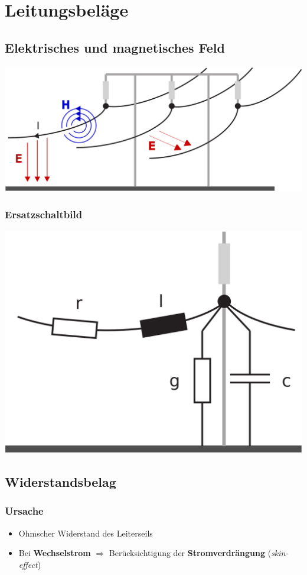 \section{Leitungsbeläge}

\subsection{Elektrisches und magnetisches Feld}
\includegraphics[width=0.98\columnwidth, align=c]{images/Elektrisches_und_Magnetisches_Feld.png}

\subsubsection{Ersatzschaltbild}

\includegraphics[width=0.55\columnwidth, align=c]{images/Ersatzschaltbild.png}


\subsection{Widerstandsbelag}

\subsubsection{Ursache}
\begin{itemize}
    \item Ohmscher Widerstand des Leiterseils
    \item Bei \textbf{Wechselstrom} $\Rightarrow$ Berücksichtigung der \textbf{Stromverdrängung} (\textit{skin-effect})
\end{itemize}


